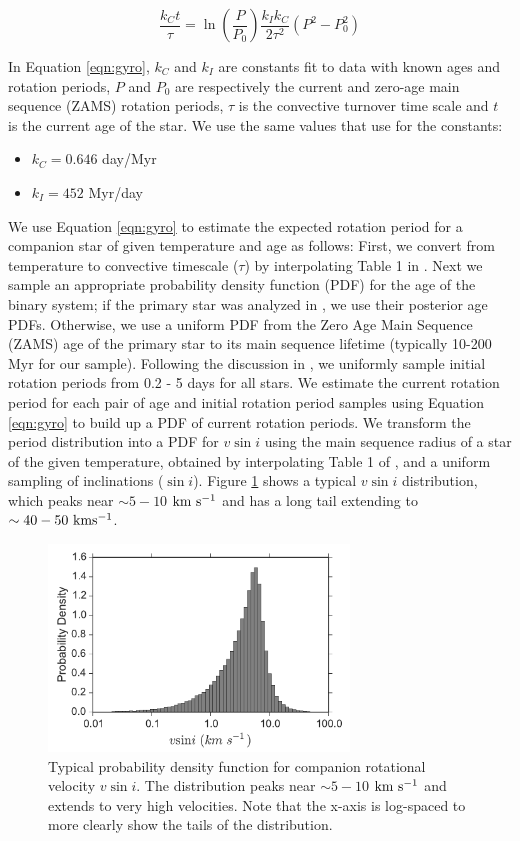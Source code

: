 \documentclass{emulateapj}
\begin{document}
\begin{equation}
\frac{k_Ct}{\tau} = \ln\left ( \frac{P}{P_0} \right ) \frac{k_Ik_C}{2\tau^2} (P^2 - P_0^2)
\label{eqn:gyro}
\end{equation}

In Equation \ref{eqn:gyro}, $k_C$ and $k_I$ are constants fit to data with known ages and rotation periods, $P$ and $P_0$ are respectively the current and zero-age main sequence (ZAMS) rotation periods, $\tau$ is the convective turnover time scale and $t$ is the current age of the star. We use the same values that \cite{Barnes2010b} use for the constants:

\begin{itemize}
\item $k_C = 0.646$ day/Myr
\item $k_I = 452$ Myr/day
\end{itemize}

We use Equation \ref{eqn:gyro} to estimate the expected rotation period for a companion star of given temperature and age as follows: First, we convert from temperature to convective timescale ($\tau$) by interpolating Table 1 in \citet{Barnes2010a}. Next we sample an appropriate probability density function (PDF) for the age of the binary system; if the primary star was analyzed in \citet{David2015}, we use their posterior age PDFs. Otherwise, we use a uniform PDF from the Zero Age Main Sequence (ZAMS) age of the primary star to its main sequence lifetime (typically 10-200 Myr for our sample). Following the discussion in \cite{Barnes2010b}, we uniformly sample initial rotation periods from 0.2 - 5 days for all stars. We estimate the current rotation period for each pair of age and initial rotation period samples using Equation \ref{eqn:gyro} to build up a PDF of current rotation periods. We transform the period distribution into a PDF for $v\sin{i}$ using the main sequence radius of a star of the given temperature, obtained by interpolating Table 1 of \cite{Barnes2010a}, and a uniform sampling of inclinations ($\sin{i}$). Figure \ref{fig:vsini} shows a typical $v\sin{i}$ distribution, which peaks near $\sim 5-10$ $\rm km \ s^{-1}$ and has a long tail extending to $\sim 40-50 \ \rm km s^{-1}$.


\begin{figure}
    \centering
    \includegraphics[width=80mm]{vsini_PDF.pdf}
    \caption{Typical probability density function for companion rotational velocity $v\sin{i}$. The distribution peaks near $\sim 5-10$ $\rm km \ s^{-1}$ and extends to very high velocities. Note that the x-axis is log-spaced to more clearly show the tails of the distribution.}
    \label{fig:vsini}
\end{figure}
\end{document}
